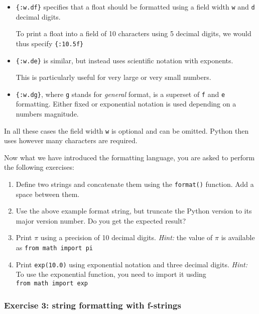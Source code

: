 \documentclass[10pt]{scrartcl}
\begin{document}
\begin{itemize}
\item
  \texttt{\{:w.df\}} specifies that a float should be formatted using a
  field width \texttt{w} and \texttt{d} decimal digits.

  To print a float into a field of 10 characters using 5 decimal digits,
  we would thus specify \texttt{\{:10.5f\}}
\item
  \texttt{\{:w.de\}} is similar, but instead uses scientific notation
  with exponents.

  This is particularly useful for very large or very small numbers.
\item
  \texttt{\{:w.dg\}}, where \texttt{g} stands for \emph{general} format,
  is a superset of \texttt{f} and \texttt{e} formatting. Either fixed or
  exponential notation is used depending on a numbers magnitude.
\end{itemize}

In all these cases the field width \texttt{w} is optional and can be
omitted. Python then uses however many characters are required.

Now what we have introduced the formatting language, you are asked to
perform the following exercises:

\begin{enumerate}
\def\labelenumi{\arabic{enumi}.}
\item
  Define two strings and concatenate them using the \texttt{format()}
  function. Add a space between them.
\item
  Use the above example format string, but truncate the Python version
  to its major version number. Do you get the expected result?
\item
  Print \(\pi\) using a precision of 10 decimal digits. \emph{Hint:} the
  value of \(\pi\) is available as \texttt{from\ math\ import\ pi}
\item
  Print \texttt{exp(10.0)} using exponential notation and three decimal
  digits. \emph{Hint:} To use the exponential function, you need to
  import it usding \texttt{from\ math\ import\ exp}
\end{enumerate}

    \hypertarget{exercise-3-string-formatting-with-f-strings}{%
\subsubsection{Exercise 3: string formatting with
f-strings}\label{exercise-3-string-formatting-with-f-strings}}
\end{document}
